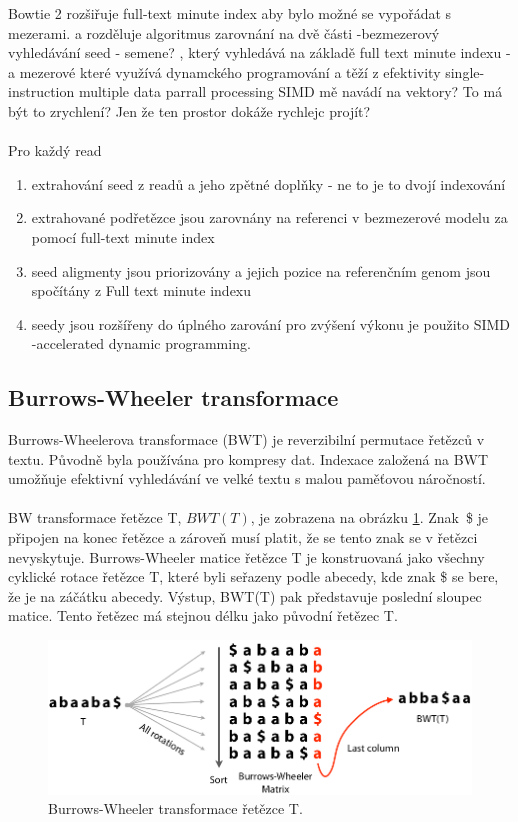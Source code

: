 \documentclass[czech,DP]{thesiskiv}
\numberwithin{equation}{section}
\begin{document}
Bowtie 2 rozšiřuje full-text minute index aby bylo možné se vypořádat s mezerami.
a rozděluje algoritmus zarovnání na dvě části
-bezmezerový vyhledávání seed - semene? , který vyhledává na základě full text minute indexu
- a mezerové které využívá dynamckého programování a těží z efektivity single- instruction multiple data parrall processing
 SIMD mě navádí na vektory? To má být to zrychlení? Jen že ten prostor dokáže rychlejc projít?
\\
\\
Pro každý read
\begin{enumerate}
	\item extrahování seed z readů a jeho zpětné doplňky - ne to je to dvojí indexování
	\item extrahované podřetězce jsou zarovnány na referenci v bezmezerové modelu za pomocí full-text minute index
	\item seed aligmenty jsou priorizovány a jejich pozice na referenčním genom jsou spočítány z Full text minute indexu
	\item seedy jsou rozšířeny do úplného zarování pro zvýšení výkonu je použito SIMD -accelerated dynamic programming.
\end{enumerate}


\subsection{Burrows-Wheeler transformace}
Burrows-Wheelerova transformace (BWT) je reverzibilní permutace řetězců v textu. Původně byla používána pro kompresy dat. Indexace založená na BWT umožňuje efektivní vyhledávání ve velké textu s malou paměťovou náročností. 
\\
\\
BW transformace řetězce T, $BWT(T)$, je zobrazena na obrázku \ref{fig:bw_transform_1}. Znak~\$ je připojen na konec řetězce a zároveň musí platit, že se tento znak se v řetězci nevyskytuje. Burrows-Wheeler matice řetězce T je konstruovaná jako všechny cyklické rotace řetězce T, které byli seřazeny podle abecedy, kde znak \$ se bere, že je na záčátku abecedy. Výstup, BWT(T) pak představuje poslední sloupec matice. Tento řetězec má stejnou délku jako původní řetězec T. \cite{bowtie} 

\begin{figure}[H]		
		\centering
		\includegraphics[width=.8\textwidth]{./img/BWT_1.png}
		\caption{Burrows-Wheeler transformace řetězce T. \cite{bw_transform}}
		\label{fig:bw_transform_1}
\end{figure}
\end{document}
